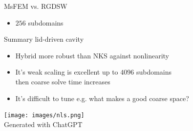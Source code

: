 \begin{frame}{MsFEM vs. RGDSW}
	\begin{itemize}
		\item $256$ subdomains
	\end{itemize}
	\begin{figure}
		\centering
		
		\label{fig:msfem-vs-rgdsw}
	\end{figure}
\end{frame}

\begin{frame}{Summary lid-driven cavity}
	\begin{itemize}
		\item Hybrid more robust than NKS against nonlinearity
		\item It's weak scaling is excellent up to $4096$ subdomains\\then coarse solve time increases %
		\item It's difficult to tune e.g. what makes a good coarse space?%
	\end{itemize}

    \begin{center}
        \texttt{[image: images/nls.png]}\\
        {\tiny \vspace{-2mm}\hspace{-4.7cm}Generated with ChatGPT}
    \end{center}
\end{frame}



